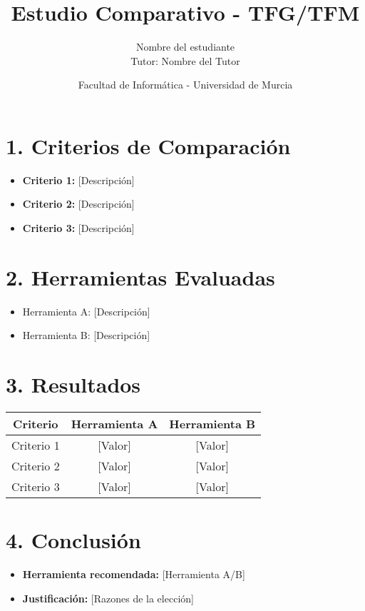 \documentclass[12pt, a4paper]{article}
\title{\textbf{Estudio Comparativo - TFG/TFM}}
\author{Nombre del estudiante \\ Tutor: Nombre del Tutor}
\date{Facultad de Informática - Universidad de Murcia}
\begin{document}
\maketitle

\section*{1. Criterios de Comparación}
\begin{itemize}
    \item \textbf{Criterio 1:} [Descripción]
    \item \textbf{Criterio 2:} [Descripción]
    \item \textbf{Criterio 3:} [Descripción]
\end{itemize}

\section*{2. Herramientas Evaluadas}
\begin{itemize}
    \item Herramienta A: [Descripción]
    \item Herramienta B: [Descripción]
\end{itemize}

\section*{3. Resultados}
\begin{tabular}{|c|c|c|}
    \hline
    \textbf{Criterio} & \textbf{Herramienta A} & \textbf{Herramienta B} \\ \hline
    Criterio 1 & [Valor] & [Valor] \\ \hline
    Criterio 2 & [Valor] & [Valor] \\ \hline
    Criterio 3 & [Valor] & [Valor] \\ \hline
\end{tabular}

\section*{4. Conclusión}
\begin{itemize}
    \item \textbf{Herramienta recomendada:} [Herramienta A/B]
    \item \textbf{Justificación:} [Razones de la elección]
\end{itemize}
\end{document}
